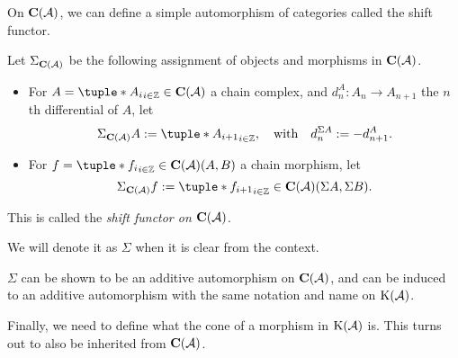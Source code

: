 On \( \operatorname{\mathbf{C}}({\mathcal{A}}) \), we can define a simple automorphism of categories called the shift functor.

\begin{definition}
    \label{def:chain_complex_shift}
    Let \( \Sigma_{\operatorname{\mathbf{C}}({\mathcal{A}})} \) be the following assignment of objects and morphisms in \( \operatorname{\mathbf{C}}({\mathcal{A}}) \).

    \begin{itemize}
        \item {
            For \( A = \tuple*{A_i}_{i \in \Zb} \in \C(\Ac) \) a chain complex, and \( d_n^A: A_n \to A_{n + 1} \) the \( n \)th differential of \( A \), let
            \[
                \Sigma_{\C(\Ac)} A := \tuple*{A_{i + 1}}_{i \in \Zb}, \quad \text{with} \quad d_n^{\Sigma A} := -d_{n + 1}^A.
            \]
        }
        \item {
            For \( f = \tuple*{f_i}_{i \in \Zb} \in \C(\Ac)(A, B) \) a chain morphism, let
            \[
                \Sigma_{\C(\Ac)} f := \tuple*{f_{i + 1}}_{i \in \Zb} \in \C(\Ac)(\Sigma A, \Sigma B).
            \]
        }
    \end{itemize}
    
    This is called the \emph{shift functor on \( \operatorname{\mathbf{C}}({\mathcal{A}}) \)}.

    We will denote it as \( \Sigma \) when it is clear from the context.
\end{definition}

\( \Sigma \) can be shown to be an additive automorphism on \( \operatorname{\mathbf{C}}({\mathcal{A}}) \), and can be induced to an additive automorphism with the same notation and name on \( \operatorname{K}({\mathcal{A}}) \).

Finally, we need to define what the cone of a morphism in \( \operatorname{K}({\mathcal{A}}) \) is. This turns out to also be inherited from \( \operatorname{\mathbf{C}}({\mathcal{A}}) \).

